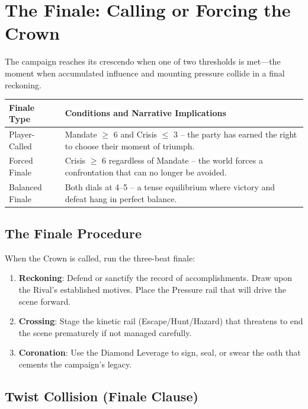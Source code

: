 \section{The Finale: Calling or Forcing the Crown}
\label{sec:calling-crown}

The campaign reaches its crescendo when one of two thresholds is met---the moment when accumulated influence and mounting pressure collide in a final reckoning.

\begin{tcolorbox}[colback=white!97!gray, colframe=black!80!gray, title=Finale Triggers and Conditions,breakable]
\begin{tabularx}{\linewidth}{lX}
\toprule
\textbf{Finale Type} & \textbf{Conditions and Narrative Implications} \\
\midrule
Player-Called & Mandate $\geq$ 6 and Crisis $\leq$ 3 -- the party has earned the right to choose their moment of triumph. \\
Forced Finale & Crisis $\geq$ 6 regardless of Mandate -- the world forces a confrontation that can no longer be avoided. \\
Balanced Finale & Both dials at 4--5 -- a tense equilibrium where victory and defeat hang in perfect balance. \\
\bottomrule
\end{tabularx}
\end{tcolorbox}

\subsection{The Finale Procedure}
\label{subsec:finale-procedure}

When the Crown is called, run the three-beat finale:
\begin{enumerate}
  \item \textbf{Reckoning}: Defend or sanctify the record of accomplishments. Draw upon the Rival's established motives. Place the Pressure rail that will drive the scene forward.
  \item \textbf{Crossing}: Stage the kinetic rail (Escape/Hunt/Hazard) that threatens to end the scene prematurely if not managed carefully.
  \item \textbf{Coronation}: Use the Diamond Leverage to sign, seal, or swear the oath that cements the campaign's legacy.
\end{enumerate}

\subsection{Twist Collision (Finale Clause)}
\label{subsec:twist-collision}

